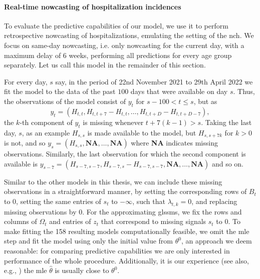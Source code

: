 \paragraph{Real-time nowcasting of hospitalization incidences}
To evaluate the predictive capabilities of our model, we use it to perform retrospective nowcasting of hospitalizations, emulating the setting of the \gls{nch}. 
We focus on same-day nowcasting, i.e. only nowcasting for the current day, with a maximum delay of $6$ weeks, performing all predictions for every age group separately. Let us call this model \ssm in the remainder of this section.

For every day, $s$ say, in the period of 22nd November 2021 to 29th April 2022 we fit the model to the data of the past $100$ days that were available on day $s$. 
Thus, the observations of the model consist of $y_{t}$ for $s - 100 < t \leq s$, but as 
$$
    y_{t} = \left( H_{t,t}, H_{t, t + 7} - H_{t,t}, \dots, H_{t, t + D}  - H_{t,t + D - 7}\right),
$$
the $k$-th component of $y_{t}$ is missing whenever $t + 7(k - 1) > s$. 
Taking the last day, $s$, as an example $H_{s,s}$ is made available to the model, but $H_{s, s+7k}$ for $k > 0$ is not, and so $y_{s} = \left( H_{s,s}, \textbf{NA}, \dots, \textbf{NA} \right)$ where \textbf{NA} indicates missing observations. Similarly, the last observation for which the second component is available is $y_{s - 7} = \left( H_{s-7, s-7}, H_{s-7, s} - H_{s - 7, s - 7}, \textbf{NA}, \dots, \textbf{NA} \right)$ and so on. 

Similar to the other models in this thesis, we can include these missing observations in a straightforward manner, by setting the corresponding rows of $B_{t}$ to $0$, setting the same entries of $s_{t}$ to $-\infty$, such that $\lambda_{t,k} = 0$, and replacing missing observations by $0$. For the approximating \glspl{glssm}, we fix the rows and columns of $\Omega_{t}$ and entries of $z_{t}$ that correspond to missing signals $s_{t}$ to $0$. 
To make fitting the 158 resulting models computationally feasible, we omit the \gls{mle} step and fit the model using only the initial value from  $\theta^{0}$, an approach we deem reasonable: for comparing predictive capabilities we are only interested in performance of the whole procedure. Additionally, it is our experience (see also, e.g., ) the \gls{mle} $\hat\theta$ is usually close to $\theta^{0}$.

